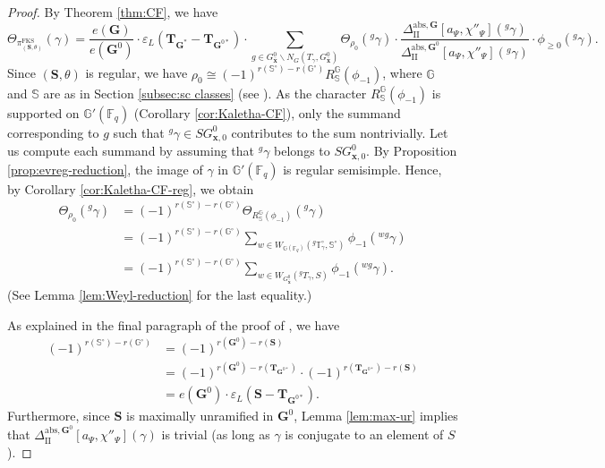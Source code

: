 \documentclass{amsart}
\newcommand{\abs}{\mathrm{abs}}
\newcommand{\FKS}{\mathrm{FKS}}
\newcommand{\bfT}{\mathbf{T}}
\newcommand{\x}{\mathbf{x}}
\newcommand{\bbT}{\mathbb{T}}
\newcommand{\F}{\mathbb{F}}
\newcommand{\bbS}{\mathbb{S}}
\newcommand{\bbG}{\mathbb{G}}
\newcommand{\bfG}{\mathbf{G}}
\newcommand{\bfS}{\mathbf{S}}
\newcommand{\II}{\mathrm{II}}
\theoremstyle{plain}
\theoremstyle{definition}
\theoremstyle{remark}
\theoremstyle{theorem}
\begin{document}
\begin{proof}
By Theorem \ref{thm:CF}, we have
\[
\Theta_{\pi^{\FKS}_{(\bfS,\theta)}}(\gamma)
=
\frac{e(\bfG)}{e(\bfG^{0})}\cdot \varepsilon_{L}(\bfT_{\bfG^{\ast}}-\bfT_{\bfG^{0\ast}})\cdot
\sum_{g \in G^{0}_{\bar{\x}}\backslash N_{G}(T_{\gamma},G^{0}_{\bar{\x}})}\Theta_{\rho_{0}}({}^{g}\gamma)\cdot\frac{\Delta_{\II}^{\abs,\bfG}[a_{\Psi},\chi''_{\Psi}]({}^{g}\gamma)}{\Delta_{\II}^{\abs,\bfG^{0}}[a_{\Psi},\chi''_{\Psi}]({}^{g}\gamma)}\cdot\phi_{\geq0}({}^{g}\gamma).
\]
Since $(\bfS,\theta)$ is regular, we have $\rho_0 \cong (-1)^{r(\bbS^{\circ})-r(\bbG^{\circ})} R_{\bbS}^{\bbG}(\phi_{-1})$, where $\bbG$ and $\bbS$ are as in Section \ref{subsec:sc classes} (see \cite[Section 3.2]{CO21}). 
As the character $R_{\bbS}^{\bbG}(\phi_{-1})$ is supported on $\bbG'(\F_{q})$ (Corollary \ref{cor:Kaletha-CF}), only the summand corresponding to $g$ such that ${}^{g}\gamma\in SG^{0}_{\x,0}$ contributes to the sum nontrivially.
Let us compute each summand by assuming that ${}^{g}\gamma$ belongs to $SG^{0}_{\x,0}$.
By Proposition \ref{prop:evreg-reduction}, the image of $\gamma$ in $\bbG'(\F_{q})$ is regular semisimple.
Hence, by Corollary \ref{cor:Kaletha-CF-reg}, we obtain
\begin{align*}
\Theta_{\rho_0}({}^{g}\gamma)
&=
(-1)^{r(\bbS^{\circ})-r(\bbG^{\circ})}\Theta_{R_{\bbS}^{\bbG}(\phi_{-1})}({}^{g}\gamma)\\
&=
(-1)^{r(\bbS^{\circ})-r(\bbG^{\circ})}\sum_{w\in W_{\bbG(\F_{q})}({}^{g}\bbT^{\circ}_{\gamma},\bbS^{\circ})}\phi_{-1}({}^{wg}\gamma)\\
&=
(-1)^{r(\bbS^{\circ})-r(\bbG^{\circ})}\sum_{w\in W_{G^{0}_{\bar{\x}}}({}^{g}T_{\gamma},S)}\phi_{-1}({}^{wg}\gamma).
\end{align*}
(See Lemma  \ref{lem:Weyl-reduction} for the last equality.)

As explained in the final paragraph of the proof of \cite[Proposition 4.9.2]{Kal19}, we have
\begin{align*}
(-1)^{r(\bbS^{\circ})-r(\bbG^{\circ})}
&=(-1)^{r(\bfG^{0})-r(\bfS)}\\
&=(-1)^{r(\bfG^{0})-r(\bfT_{\bfG^{0\ast}})}\cdot(-1)^{r(\bfT_{\bfG^{0\ast}})-r(\bfS)}\\
&=e(\bfG^{0})\cdot\varepsilon_{L}(\bfS-\bfT_{\bfG^{0\ast}}).
\end{align*}
Furthermore, since $\bfS$ is maximally unramified in $\bfG^{0}$, Lemma \ref{lem:max-ur} implies that $\Delta_{\II}^{\abs,\bfG^{0}}[a_{\Psi},\chi''_{\Psi}](\gamma)$ is trivial (as long as $\gamma$ is conjugate to an element of $S$).


\end{proof}
\end{document}
